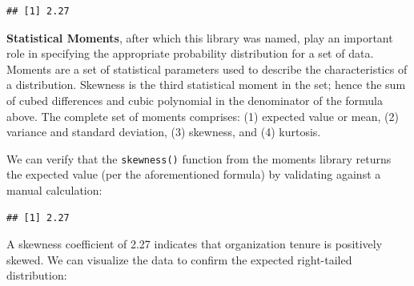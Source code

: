 \documentclass[
]{book}
\newenvironment{Shaded}{\begin{snugshade}}{\end{snugshade}}
\newcommand{\CommentTok}[1]{\textcolor[rgb]{0.56,0.35,0.01}{\textit{#1}}}
\newcommand{\DecValTok}[1]{\textcolor[rgb]{0.00,0.00,0.81}{#1}}
\newcommand{\FunctionTok}[1]{\textcolor[rgb]{0.00,0.00,0.00}{#1}}
\newcommand{\NormalTok}[1]{#1}
\newcommand{\OtherTok}[1]{\textcolor[rgb]{0.56,0.35,0.01}{#1}}
\newcommand{\SpecialCharTok}[1]{\textcolor[rgb]{0.00,0.00,0.00}{#1}}
\begin{document}
\begin{verbatim}
## [1] 2.27
\end{verbatim}

\textbf{Statistical Moments}, after which this library was named, play an important role in specifying the appropriate probability distribution for a set of data. Moments are a set of statistical parameters used to describe the characteristics of a distribution. Skewness is the third statistical moment in the set; hence the sum of cubed differences and cubic polynomial in the denominator of the formula above. The complete set of moments comprises: (1) expected value or mean, (2) variance and standard deviation, (3) skewness, and (4) kurtosis.

We can verify that the \texttt{skewness()} function from the moments library returns the expected value (per the aforementioned formula) by validating against a manual calculation:

\begin{Shaded}
\end{Shaded}

\begin{verbatim}
## [1] 2.27
\end{verbatim}

A skewness coefficient of 2.27 indicates that organization tenure is positively skewed. We can visualize the data to confirm the expected right-tailed distribution:
\end{document}
